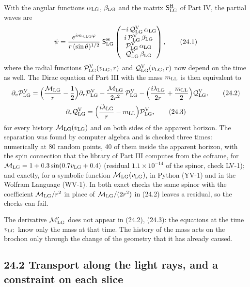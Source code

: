 \documentclass[
  10pt,
]{article}
\begin{document}
With the angular functions \(\alpha_{\rm LG}\), \(\beta_{\rm LG}\) and
the matrix \(\mathsf S^{\rm H}_{\rm LG}\) of Part IV, the partial waves
are
\[\psi=\frac{e^{im_{j,{\rm LG}}\varphi}}{r\,(\sin\theta)^{1/2}}\;\mathsf S^{\rm H}_{\rm LG}\begin{pmatrix}-i\,\mathcal Q^{\rm V}_{\rm LG}\,\alpha_{\rm LG}\\i\,\mathcal P^{\rm V}_{\rm LG}\,\beta_{\rm LG}\\\mathcal P^{\rm V}_{\rm LG}\,\alpha_{\rm LG}\\\mathcal Q^{\rm V}_{\rm LG}\,\beta_{\rm LG}\end{pmatrix},\tag{24.1}\]
where the radial functions \(\mathcal P^{\rm V}_{\rm LG}(v_{\rm LG},r)\)
and \(\mathcal Q^{\rm V}_{\rm LG}(v_{\rm LG},r)\) now depend on the time
as well. The Dirac equation of Part III with the mass \(m_{\rm LL}\) is
then equivalent to
\[\partial_v\mathcal P^{\rm V}_{\rm LG}=\Big(\frac{\mathcal M_{\rm LG}}r-\frac12\Big)\partial_r\mathcal P^{\rm V}_{\rm LG}-\frac{\mathcal M_{\rm LG}}{2r^2}\,\mathcal P^{\rm V}_{\rm LG}-\Big(\frac{i\lambda_{\rm LG}}{2r}+\frac{m_{\rm LL}}2\Big)\mathcal Q^{\rm V}_{\rm LG},\tag{24.2}\]
\[\partial_r\mathcal Q^{\rm V}_{\rm LG}=\Big(\frac{i\lambda_{\rm LG}}r-m_{\rm LL}\Big)\mathcal P^{\rm V}_{\rm LG},\tag{24.3}\]
for every history \(\mathcal M_{\rm LG}(v_{\rm LG})\) and on both sides
of the apparent horizon. The separation was found by computer algebra
and is checked three times: numerically at 80 random points, 40 of them
inside the apparent horizon, with the spin connection that the library
of Part III computes from the coframe, for
\(\mathcal M_{\rm LG}=1+0.3\sin(0.7v_{\rm LG}+0.4)\) (residual
\(1.1\times10^{-14}\) of the spinor, check LV-1); and exactly, for a
symbolic function \(\mathcal M_{\rm LG}(v_{\rm LG})\), in Python (YV-1)
and in the Wolfram Language (WV-1). In both exact checks the same spinor
with the coefficient \(\mathcal M_{\rm LG}/r^2\) in place of
\(\mathcal M_{\rm LG}/(2r^2)\) in (24.2) leaves a residual, so the
checks can fail.

The derivative \(\mathcal M_{\rm LG}'\) does not appear in (24.2),
(24.3): the equations at the time \(v_{\rm LG}\) know only the mass at
that time. The history of the mass acts on the brochon only through the
change of the geometry that it has already caused.

\hypertarget{transport-along-the-light-rays-and-a-constraint-on-each-slice}{%
\subsection{24.2 Transport along the light rays, and a constraint on
each
slice}\label{transport-along-the-light-rays-and-a-constraint-on-each-slice}}
\end{document}
